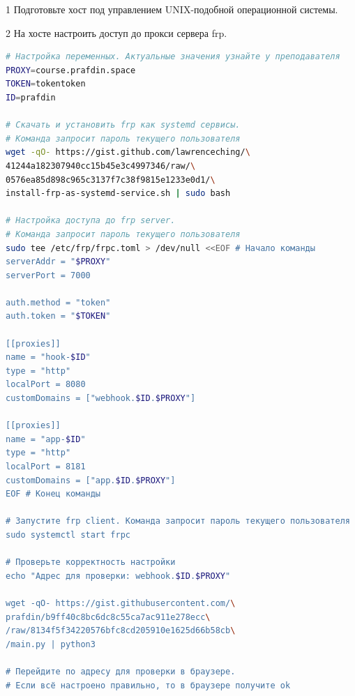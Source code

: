 \documentclass[12pt,a4paper]{article}
\begin{document}
\begin{task}{1}
    Подготовьте хост под управлением UNIX-подобной операционной системы.
\end{task}

\begin{task}{2}
    На хосте настроить доступ до прокси сервера frp.

    \begin{lstlisting}[language=bash, numbers=none, frame=single, basicstyle=\ttfamily\footnotesize, columns=fullflexible, keepspaces=true, breaklines=false, commentstyle=\color{gray}\itshape, extendedchars=true, texcl=true, showstringspaces=false]
# Настройка переменных. Актуальные значения узнайте у преподавателя
PROXY=course.prafdin.space
TOKEN=tokentoken
ID=prafdin

# Скачать и установить frp как systemd сервисы.
# Команда запросит пароль текущего пользователя
wget -qO- https://gist.github.com/lawrenceching/\
41244a182307940cc15b45e3c4997346/raw/\
0576ea85d898c965c3137f7c38f9815e1233e0d1/\
install-frp-as-systemd-service.sh | sudo bash

# Настройка доступа до frp server.
# Команда запросит пароль текущего пользователя
sudo tee /etc/frp/frpc.toml > /dev/null <<EOF # Начало команды
serverAddr = "$PROXY"
serverPort = 7000

auth.method = "token"
auth.token = "$TOKEN"

[[proxies]]
name = "hook-$ID"
type = "http"
localPort = 8080
customDomains = ["webhook.$ID.$PROXY"]

[[proxies]]
name = "app-$ID"
type = "http"
localPort = 8181
customDomains = ["app.$ID.$PROXY"]
EOF # Конец команды

# Запустите frp client. Команда запросит пароль текущего пользователя
sudo systemctl start frpc

# Проверьте корректность настройки
echo "Адрес для проверки: webhook.$ID.$PROXY"

wget -qO- https://gist.githubusercontent.com/\
prafdin/b9ff40c8bc6dc8c55ca7ac911e278ecc\
/raw/8134f5f34220576bfc8cd205910e1625d66b58cb\
/main.py | python3

# Перейдите по адресу для проверки в браузере.
# Если всё настроено правильно, то в браузере получите ok
\end{lstlisting}

\end{task}
\end{document}
